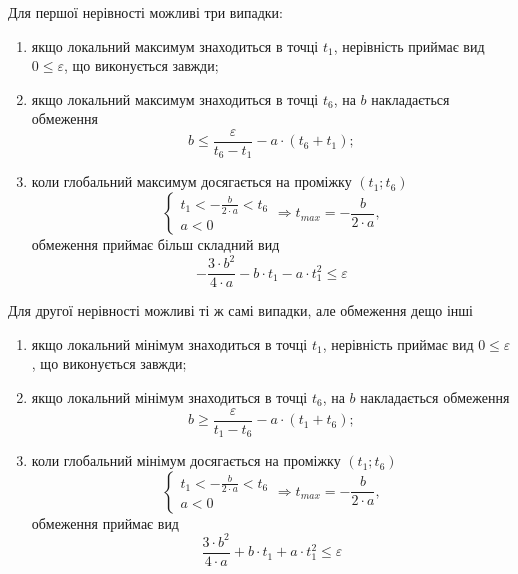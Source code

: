 Для першої нерівності можливі три випадки:
\begin{enumerate}
  \item
    якщо локальний максимум знаходиться в точці $t_1$, нерівність приймає вид
    $0 \le \varepsilon$, що виконується завжди;
  \item
    якщо локальний максимум знаходиться в точці $t_6$, на $b$ накладається
    обмеження
    \begin{equation*}
      b \le \frac{\varepsilon}{t_6 - t_1} - a \cdot \left( t_6 + t_1 \right);
    \end{equation*}
  \item
    коли глобальний максимум досягається на проміжку $\left( t_1; t_6 \right)$
    \begin{equation*}
      \begin{cases}
        t_1 < - \frac{b}{2 \cdot a} < t_6 \\
        a < 0
      \end{cases} \Rightarrow
      t_{max} = - \frac{b}{2 \cdot a},
    \end{equation*}
    обмеження приймає більш складний вид
    \begin{equation*}
      - \frac{3 \cdot b^2}{4 \cdot a} - b \cdot t_1 - a \cdot t_1^2
      \le \varepsilon
    \end{equation*}
\end{enumerate}

Для другої нерівності можливі ті ж самі випадки, але обмеження дещо інші
\begin{enumerate}
  \item
    якщо локальний мінімум знаходиться в точці $t_1$, нерівність приймає вид
    $0 \le \varepsilon$, що виконується завжди;
  \item
    якщо локальний мінімум знаходиться в точці $t_6$, на $b$ накладається
    обмеження
    \begin{equation*}
      b \ge \frac{\varepsilon}{t_1 - t_6} - a \cdot \left( t_1 + t_6 \right);
    \end{equation*}
  \item
    коли глобальний мінімум досягається на проміжку $\left( t_1; t_6 \right)$
    \begin{equation*}
      \begin{cases}
        t_1 < - \frac{b}{2 \cdot a} < t_6 \\
        a < 0
      \end{cases} \Rightarrow
      t_{max} = - \frac{b}{2 \cdot a},
    \end{equation*}
    обмеження приймає вид
    \begin{equation*}
      \frac{3 \cdot b^2}{4 \cdot a} + b \cdot t_1 + a \cdot t_1^2
      \le \varepsilon
    \end{equation*}
\end{enumerate}


